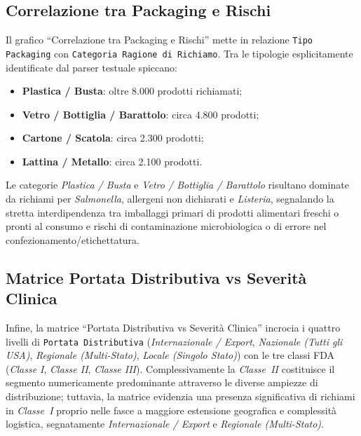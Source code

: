 \subsection{Correlazione tra Packaging e Rischi}
Il grafico ``Correlazione tra Packaging e Rischi'' mette in relazione \texttt{Tipo Packaging} con \texttt{Categoria Ragione di Richiamo}. Tra le tipologie esplicitamente identificate dal parser testuale spiccano:
\begin{itemize}
    \item \textbf{Plastica / Busta}: oltre 8.000 prodotti richiamati;
    \item \textbf{Vetro / Bottiglia / Barattolo}: circa 4.800 prodotti;
    \item \textbf{Cartone / Scatola}: circa 2.300 prodotti;
    \item \textbf{Lattina / Metallo}: circa 2.100 prodotti.
\end{itemize}
Le categorie \textit{Plastica / Busta} e \textit{Vetro / Bottiglia / Barattolo} risultano dominate da richiami per \textit{Salmonella}, allergeni non dichiarati e \textit{Listeria}, segnalando la stretta interdipendenza tra imballaggi primari di prodotti alimentari freschi o pronti al consumo e rischi di contaminazione microbiologica o di errore nel confezionamento/etichettatura.

\subsection{Matrice Portata Distributiva vs Severità Clinica}
Infine, la matrice ``Portata Distributiva vs Severità Clinica'' incrocia i quattro livelli di \texttt{Portata Distributiva} (\textit{Internazionale / Export}, \textit{Nazionale (Tutti gli USA)}, \textit{Regionale (Multi-Stato)}, \textit{Locale (Singolo Stato)}) con le tre classi FDA (\textit{Classe I}, \textit{Classe II}, \textit{Classe III}). Complessivamente la \textit{Classe~II} costituisce il segmento numericamente predominante attraverso le diverse ampiezze di distribuzione; tuttavia, la matrice evidenzia una presenza significativa di richiami in \textit{Classe~I} proprio nelle fasce a maggiore estensione geografica e complessità logistica, segnatamente \textit{Internazionale / Export} e \textit{Regionale (Multi-Stato)}. 


